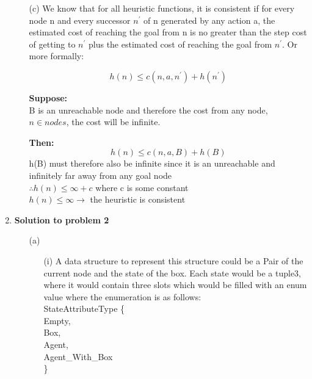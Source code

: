 \begin{enumerate}
\begin{enumerate}
\begin{enumerate}
			\end{enumerate}
			\item[(c)] We know that for all heuristic functions, it is consistent if for every node n and every successor \(n^{\prime} \) of n  generated by any action a, the estimated cost of reaching the goal from n is no greater than the step cost of getting to \(n^{\prime} \) plus the estimated cost of reaching the goal from \(n^{\prime} \).  Or more formally: 
			
			\[ 
				h(n) \le c(n,a,n^\prime) + h(n^\prime) 
			\]
			
			\textbf{Suppose:}  \\
			B is an unreachable node and therefore the cost from any node, \(n \in nodes\), the cost will be infinite.
			
			\textbf{Then:} \\
			\[ h(n) \le c(n,a,B) + h(B) \]
			h(B) must therefore also be infinite since it is an unreachable and infinitely far away from any goal node \\
			
			\(\therefore h(n) \le \infty + c \) where c is some constant \\
			\hspace*{3 mm} \( h(n) \le \infty \rightarrow  \)  the heuristic is consistent
		\end{enumerate}
			
 	\item {\bf Solution to problem 2}
	
		\begin{enumerate}
			\item[(a)]
				\begin{enumerate}
					\item[(i)] A data structure to represent this structure could be a Pair of the current node and the state of the box. Each state would be a tuple3, where it would contain three slots which would be filled with an enum value where the enumeration is as follows:\\
					
						StateAttributeType \{ \\
						\hspace*{4mm} Empty, \\
						\hspace*{4mm} Box, \\
						\hspace*{4mm} Agent, \\ 
						\hspace*{4mm} Agent\_With\_Box \\
						\} \\
						

\end{enumerate}
\end{enumerate}
\end{enumerate}
